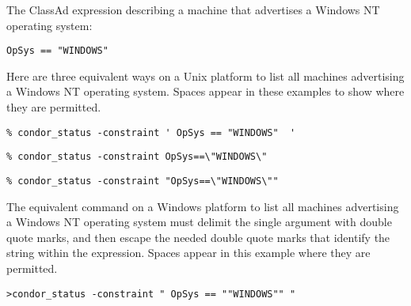 The ClassAd expression describing a machine that
advertises a Windows NT operating system:
\footnotesize
\begin{verbatim}
OpSys == "WINDOWS"
\end{verbatim}
\normalsize
Here are three equivalent ways on a Unix platform to list all machines
advertising a Windows NT operating system.
Spaces appear in these examples to show where they are permitted.
\footnotesize
\begin{verbatim}
% condor_status -constraint ' OpSys == "WINDOWS"  '
\end{verbatim}
\normalsize
\footnotesize
\begin{verbatim}
% condor_status -constraint OpSys==\"WINDOWS\"
\end{verbatim}
\normalsize
\footnotesize
\begin{verbatim}
% condor_status -constraint "OpSys==\"WINDOWS\""
\end{verbatim}
\normalsize

The equivalent command on a Windows platform to list all machines
advertising a Windows NT operating system must delimit the single
argument with double quote marks, and then escape the needed
double quote marks that identify the string within the expression. 
Spaces appear in this example where they are permitted.
\footnotesize
\begin{verbatim}
>condor_status -constraint " OpSys == ""WINDOWS"" "
\end{verbatim}
\normalsize

